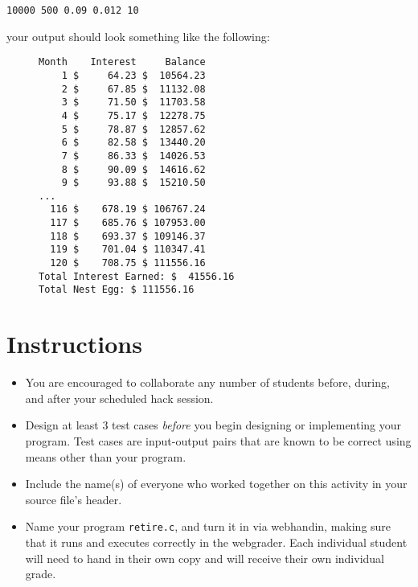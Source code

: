 \documentclass[12pt]{scrartcl}
\begin{document}
\texttt{10000 500 0.09 0.012 10} 

your output should look something like the following:

\begin{figure}[H]
\begin{verbatim}
Month    Interest     Balance 
    1 $     64.23 $  10564.23
    2 $     67.85 $  11132.08
    3 $     71.50 $  11703.58
    4 $     75.17 $  12278.75
    5 $     78.87 $  12857.62
    6 $     82.58 $  13440.20
    7 $     86.33 $  14026.53
    8 $     90.09 $  14616.62
    9 $     93.88 $  15210.50
...    
  116 $    678.19 $ 106767.24
  117 $    685.76 $ 107953.00
  118 $    693.37 $ 109146.37
  119 $    701.04 $ 110347.41
  120 $    708.75 $ 111556.16
Total Interest Earned: $  41556.16
Total Nest Egg: $ 111556.16
\end{verbatim}
\end{figure}

\section*{Instructions}

\begin{itemize}
  \item You are encouraged to collaborate any number of students 
  before, during, and after your scheduled hack session.  
  \item Design at least 3 test cases \emph{before} you begin
  designing or implementing your program.  Test cases are 
  input-output pairs that are known to be correct using means
  other than your program.
  \item Include the name(s) of everyone who worked together on
  this activity in your source file's header.
  \item Name your program \texttt{retire.c}, and
  turn it in via webhandin, making sure that it runs and executes
  correctly in the webgrader.  Each individual student will need
  to hand in their own copy and will receive their own individual
  grade.
\end{itemize}
  
\end{document}

